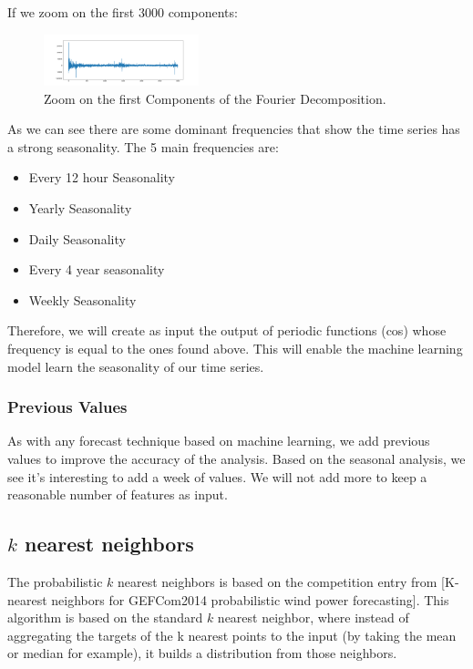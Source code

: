 \documentclass[a4paper,twocolumn,5p]{elsarticle}
\begin{document}
If we zoom on the first 3000 components:

\begin{figure}
  \caption{Zoom on the first Components of the Fourier Decomposition.}
  \centering
  \includegraphics[width=0.4\textwidth]{decompositionzoom}
\end{figure}


As we can see there are some dominant frequencies that show the time series has a strong seasonality. The 5 main 
frequencies are:

\begin{itemize}
  \item Every 12 hour Seasonality
  \item Yearly Seasonality
  \item Daily Seasonality
  \item Every 4 year seasonality
  \item Weekly Seasonality
\end{itemize} 

Therefore, we will create as input the output of periodic functions (cos) whose frequency is equal to the ones found 
above. This will enable the machine learning model learn the seasonality of our time series.

\subsubsection{Previous Values}

As with any forecast technique based on machine learning, we add previous values to improve the accuracy 
of the analysis. Based on the seasonal analysis, we see it's interesting to add a week of values. We will not 
add more to keep a reasonable number of features as input.

\subsection{$k$ nearest neighbors}

The probabilistic $k$ nearest neighbors is based on the competition entry from 
[K-nearest neighbors for GEFCom2014 probabilistic wind power forecasting]. 
This algorithm is based on the standard $k$ nearest neighbor, where instead of aggregating the targets of the
k nearest points to the input (by taking the mean or median for example), it builds a distribution 
from those neighbors.
\end{document}
